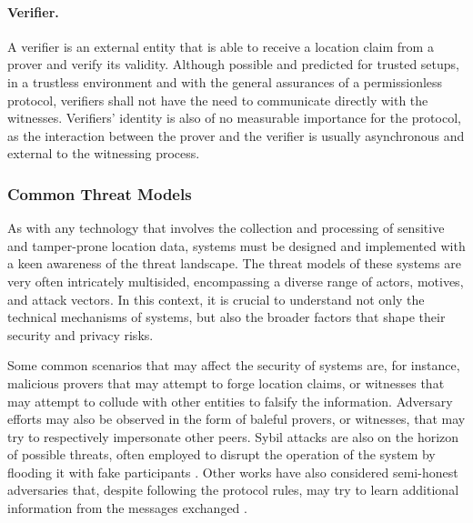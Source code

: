 \paragraph{Verifier.} A verifier is an external entity that is able to receive a location claim from a prover and verify its validity. Although possible and predicted for trusted setups, in a trustless environment and with the general assurances of a permissionless protocol, verifiers shall not have the need to communicate directly with the witnesses. Verifiers' identity is also of no measurable importance for the protocol, as the interaction between the prover and the verifier is usually asynchronous and external to the witnessing process.


\subsubsection{Common Threat Models}

As with any technology that involves the collection and processing of sensitive and tamper-prone location data, \pol systems must be designed and implemented with a keen awareness of the threat landscape. The threat models of these systems are very often intricately multisided, encompassing a diverse range of actors, motives, and attack vectors. In this context, it is crucial to understand not only the technical mechanisms of \pol systems, but also the broader factors that shape their security and privacy risks. 

Some common scenarios that may affect the security of \pol systems are, for instance, malicious provers that may attempt to forge location claims, or witnesses that may attempt to collude with other entities to falsify the information. Adversary efforts may also be observed in the form of baleful provers, or witnesses, that may try to respectively impersonate other peers. Sybil attacks are also on the horizon of possible threats, often employed to disrupt the operation of the system by flooding it with fake participants \cite{nasrulin2018robust}. Other works have also considered semi-honest adversaries that, despite following the protocol rules, may try to learn additional information from the messages exchanged \cite{dupin2018location}.